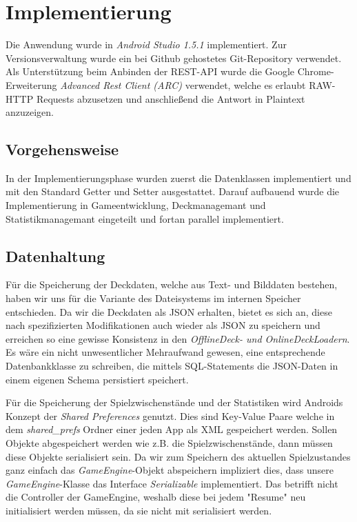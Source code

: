 \chapter{Implementierung}
\label{cha:implementierung}


Die Anwendung wurde in \emph{Android Studio 1.5.1} implementiert. Zur Versionsverwaltung wurde ein bei Github gehostetes Git-Repository verwendet. Als Unterstützung beim Anbinden der REST-API wurde die Google Chrome-Erweiterung \emph{Advanced Rest Client (ARC)} verwendet, welche es erlaubt RAW-HTTP Requests abzusetzen und anschließend die Antwort in Plaintext anzuzeigen.

\section{Vorgehensweise}
In der Implementierungsphase wurden zuerst die Datenklassen implementiert und mit den Standard Getter und Setter ausgestattet. Darauf aufbauend wurde die Implementierung in Gameentwicklung, Deckmanagemant und Statistikmanagemant eingeteilt und fortan parallel implementiert. 


\section{Datenhaltung}
Für die Speicherung der Deckdaten, welche aus Text- und Bilddaten bestehen, haben wir uns für die Variante des Dateisystems im internen Speicher entschieden. Da wir die Deckdaten als JSON erhalten, bietet es sich an, diese nach spezifizierten Modifikationen auch wieder als JSON zu speichern und erreichen so eine gewisse Konsistenz in den \emph{OfflineDeck- und OnlineDeckLoadern}. Es wäre ein nicht unwesentlicher Mehraufwand gewesen, eine entsprechende Datenbankklasse zu schreiben, die mittels SQL-Statements die JSON-Daten in einem eigenen Schema persistiert speichert. 

Für die Speicherung der Spielzwischenstände und der Statistiken wird Androids Konzept der \emph{Shared Preferences} genutzt. Dies sind Key-Value Paare welche in dem \emph{shared\_prefs} Ordner einer jeden App als XML gespeichert werden. Sollen Objekte abgespeichert werden wie z.B. die Spielzwischenstände, dann müssen diese Objekte serialisiert sein. Da wir zum Speichern des aktuellen Spielzustandes ganz einfach das \emph{GameEngine}-Objekt abspeichern impliziert dies, dass unsere \emph{GameEngine}-Klasse das Interface \emph{Serializable} implementiert. Das betrifft nicht die Controller der GameEngine, weshalb diese bei jedem "Resume" neu initialisiert werden müssen, da sie nicht mit serialisiert werden.

